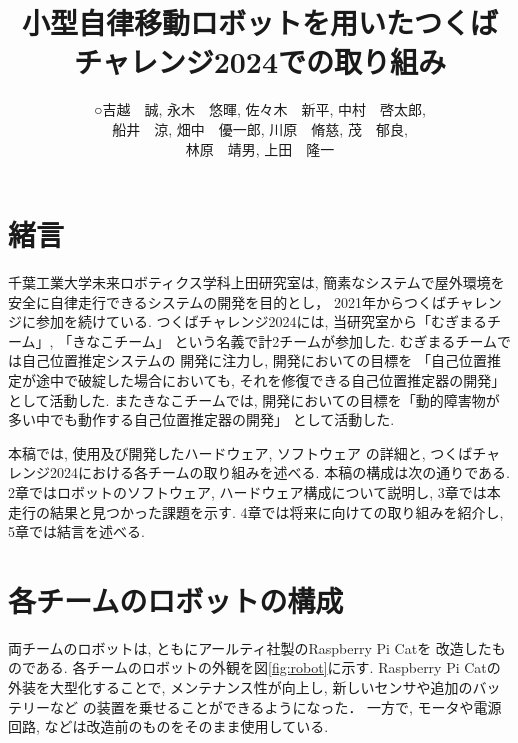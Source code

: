 \documentclass[twocolumn,9pt]{jsproceedings}
\title{小型自律移動ロボットを用いたつくばチャレンジ2024での取り組み}
\author{○吉越　誠\authorrefmark{2}, 永木　悠暉\authorrefmark{1}, 佐々木　新平\authorrefmark{1}, 中村　啓太郎\authorrefmark{1}, 
\\船井　涼\authorrefmark{2}, 畑中　優一郎\authorrefmark{2}, 川原　脩慈\authorrefmark{1}, 茂　郁良\authorrefmark{1}, 
\\林原　靖男\authorrefmark{1}, 上田　隆一\authorrefmark{1}}
\affiliation{千葉工業大学 未来ロボティクス学科 上田研究室 むぎまるチーム/きなこチーム}
\begin{document}
\maketitle


\section{緒言}
千葉工業大学未来ロボティクス学科上田研究室は, 
簡素なシステムで屋外環境を安全に自律走行できるシステムの開発を目的とし，
2021年からつくばチャレンジに参加を続けている. 
つくばチャレンジ2024には, 
当研究室から「むぎまるチーム」, 「きなこチーム」
という名義で計2チームが参加した. 
むぎまるチームでは自己位置推定システムの
開発に注力し, 開発においての目標を
「自己位置推定が途中で破綻した場合においても, 
それを修復できる自己位置推定器の開発」として活動した. 
またきなこチームでは, 
開発においての目標を「動的障害物が多い中でも動作する自己位置推定器の開発」
として活動した. 

本稿では, 使用及び開発したハードウェア, ソフトウェア
の詳細と, つくばチャレンジ2024における各チームの取り組みを述べる. 
本稿の構成は次の通りである. 
2章ではロボットのソフトウェア, ハードウェア構成について説明し, 
3章では本走行の結果と見つかった課題を示す. 
4章では将来に向けての取り組みを紹介し, 
5章では結言を述べる. 


\section{各チームのロボットの構成}
両チームのロボットは, 
ともにアールティ社製のRaspberry Pi Cat\cite{RTshop}を
改造したものである. 
各チームのロボットの外観を図\ref{fig:robot}に示す. 
Raspberry Pi Catの外装を大型化することで, 
メンテナンス性が向上し, 
新しいセンサや追加のバッテリーなど
の装置を乗せることができるようになった． 
一方で, モータや電源回路, 
などは改造前のものをそのまま使用している. 
\end{document}
